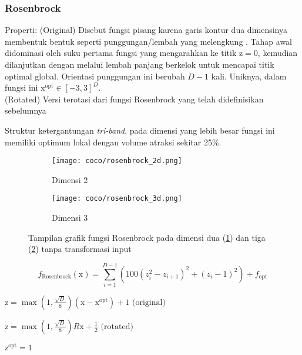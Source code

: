 \subsubsection{Rosenbrock}
\noindent Properti:
(Original) Disebut fungsi pisang karena garis kontur dua dimensinya membentuk bentuk seperti punggungan/lembah yang melengkung \citep{Rosenbrock:1960:AMF}. Tahap awal didominasi oleh suku pertama fungsi yang mengarahkan ke titik $\mathrm{z} = 0$, kemudian dilanjutkan dengan melalui lembah panjang berkelok untuk mencapai titik optimal global. Orientasi punggungan ini berubah $D-1$ kali. Uniknya, dalam fungsi ini $\mathrm{x}^{\text{opt}}\in[-3, 3]^D$.\\
(Rotated) Versi terotasi dari fungsi Rosenbrock yang telah didefinisikan sebelumnya
\begin{packed_item}
  \item Struktur ketergantungan \textit{tri-band}, pada dimensi yang lebih besar fungsi ini memiliki optimum lokal dengan volume atraksi sekitar 25\%.
\end{packed_item}
\begin{figure}[H]
	\centering
	\begin{subfigure}[b]{0.4\textwidth}
		\centering
		\texttt{[image: coco/rosenbrock\_2d.png]}
		\caption{Dimensi 2}
		\label{fig:rosenbrock_coco_2d}
	\end{subfigure}
	\hfill
	\begin{subfigure}[b]{0.4\textwidth}
		\centering
		\texttt{[image: coco/rosenbrock\_3d.png]}
		\caption{Dimensi 3}
		\label{fig:rosenbrock_coco_3d}
	\end{subfigure}
	\caption{Tampilan grafik fungsi Rosenbrock pada dimensi dua (\cref{fig:rosenbrock_coco_2d}) dan tiga (\cref{fig:rosenbrock_coco_3d}) tanpa transformasi input}
	\label{fig:rosenbrock_coco}
\end{figure}
\begin{equation}
  f_{\text{Rosenbrock}}(\mathrm{x})=\sum_{i=1}^{D-1}(100(z_i^2-z_{i+1})^2+(z_i-1)^2)+f_{\text{opt}}
\end{equation}
\begin{packed_item}
    \item $\mathrm{z}=\max(1,\frac{\sqrt{D}}{8})(\mathrm{x}-\mathrm{x}^{\text{opt}})+1\text{ (original)}$\\
    \item $\mathrm{z}=\max(1,\frac{\sqrt{D}}{8})R\mathrm{x}+\frac{1}{2}\text{ (rotated)}$
    \item $\mathrm{z}^{\text{opt}}=1$
\end{packed_item}


